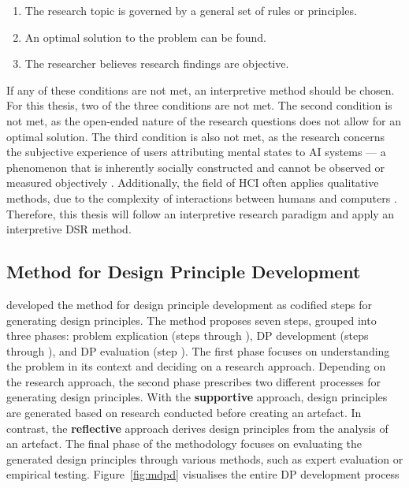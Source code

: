 \begin{enumerate}[noitemsep]
    \item The research topic is governed by a general set of rules or principles.
    \item An optimal solution to the problem can be found.
    \item The researcher believes research findings are objective.
\end{enumerate}

If any of these conditions are not met, an interpretive method should be chosen. For this thesis, two of the three conditions are not met. The second condition is not met, as the open-ended nature of the research questions does not allow for an optimal solution. The third condition is also not met, as the research concerns the subjective experience of users attributing mental states to \ac{AI} systems — a phenomenon that is inherently socially constructed and cannot be observed or measured objectively \parencite{Denzin2023}. Additionally, the field of \ac{HCI} often applies qualitative methods, due to the complexity of interactions between humans and computers \parencite{Adams2008}. Therefore, this thesis will follow an interpretive research paradigm and apply an interpretive \ac{DSR} method.

\subsection{Method for Design Principle Development} \label{ssec:mdpd}

\textcite{Moeller2020} developed the method for design principle development as codified steps for generating design principles. The method proposes seven steps, grouped into three phases: problem explication (steps  through ), \ac{DP} development (steps  through ), and \ac{DP} evaluation (step ). The first phase focuses on understanding the problem in its context and deciding on a research approach. Depending on the research approach, the second phase prescribes two different processes for generating design principles. With the \textbf{supportive} approach, design principles are generated based on research conducted before creating an artefact. In contrast, the \textbf{reflective} approach derives design principles from the analysis of an artefact. The final phase of the methodology focuses on evaluating the generated design principles through various methods, such as expert evaluation or empirical testing. Figure~\ref{fig:mdpd} visualises the entire \ac{DP} development process

